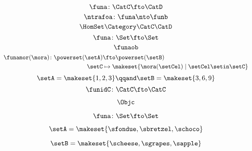 \begin{forslides}
\begin{equation}
        \funa\colon\CatC\fto\CatD
    \end{equation}
    \begin{equation}
        \label{eq:slides_ntrafoa}
        \ntrafoa\colon\funa\nto\funb
    \end{equation}
    \begin{equation}
        \label{eq:slides_hom}
        \HomSet\Category\CatC\CatD
    \end{equation}
    \begin{equation}
        \label{eq:pow_fun_1}
        \funa\colon \Set \fto \Set
    \end{equation}
    \begin{equation}
        \label{eq:pow_fun_2}
        \funaob
    \end{equation}
    \begin{equation}
        \label{eq:pow_fun_3}
        \begin{aligned}
            \funamor(\mora)\colon \powerset(\setA) & \fto \powerset(\setB) \\
            \setC                                  & \mapsto \makeset{ \mora(\setCel) \mid \setCel \setin \setC}
        \end{aligned}
    \end{equation}
    \begin{equation}
        \label{eq:pow_fun_4}
        \setA=\makeset{ 1,2,3} \qqand \setB=\makeset{3,6,9}
    \end{equation}
    \begin{equation}
        \label{eq:idfun}
        \funidC \colon \CatC \fto \CatC
    \end{equation}

    \begin{equation}
        \label{eq:slides-translation-00}
        \Objc
    \end{equation}

    \begin{equation}
        \label{eq:slides-translation-01}
        \funa\colon \Set \fto \Set
    \end{equation}

    \begin{equation}
        \label{eq:slides-translation-02}
        \setA = \makeset{\sfondue, \sbretzel, \schoco}
    \end{equation}

    \begin{equation}
        \label{eq:slides-translation-03}
        \setB = \makeset{\scheese,\sgrapes,\sapple}
    \end{equation}


\end{forslides}
